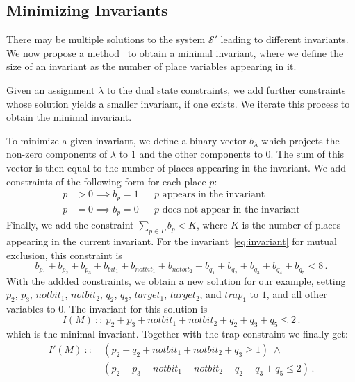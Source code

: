 \subsection{Minimizing Invariants}
\label{sec_invariant_w_minimization}

There may be multiple solutions to the system $\mathcal{S}'$
leading to different invariants. 
We now propose a method \invariantwmin\ to obtain a minimal
invariant, where we define the size of an invariant as the number of 
place variables appearing in it.

Given an assignment $\lambda$ to the dual state constraints,
we add further constraints whose solution yields a
smaller invariant, if one exists. 
We iterate this process to obtain the minimal invariant.

To minimize a given invariant, we define a binary vector $b_\lambda$ which projects the
non-zero components of $\lambda$ to 1 and the other components to 0.
The sum of this vector is then equal to the number of places appearing
in the invariant.
We add constraints of the following form for each place $p$:
\begin{align*}
p &> 0 \implies b_{p} = 1 && \text{$p$ appears in the invariant} \\
p &= 0 \implies b_{p} = 0 && \text{$p$ does not appear in the invariant}
\end{align*}
Finally, we add the constraint $\sum_{p\in P} b_p < K$, where $K$ is the number
of places appearing in the current invariant.
For the invariant~\eqref{eq:invariant} for mutual exclusion, this constraint is
$$
    b_{p_1} + b_{p_2} + b_{p_3} + b_{bit_1} + b_{notbit_1} + b_{notbit_2} +
    b_{q_1} + b_{q_2} + b_{q_3} + b_{q_4} + b_{q_5} < 8\,.
$$
With the addded constraints, we obtain a new solution for our 
example, setting $p_2$, $p_3$, $notbit_1$, $notbit_2$, $q_2$, $q_3$,
$target_1$, $target_2$, and $trap_1$ to $1$, and all other variables
to $0$. The invariant for this solution is
$$
I(M)\ ::\  p_2 + p_3 + notbit_1 + notbit_2 + q_2 + q_3 + q_5 \le 2\,.
$$
which is the minimal invariant. Together with the trap constraint we 
finally get:
\begin{align*}
I'(M)\ ::&\ 
(p_2 + q_2 + notbit_1 + notbit_2 + q_3 \ge 1 ) \; \land \\
&\ (p_2 + p_3 + notbit_1 + notbit_2 + q_2 + q_3 + q_5 \le 2)\,.
\end{align*}



